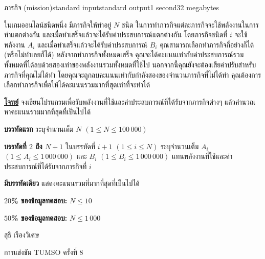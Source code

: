 \documentclass[11pt,a4paper]{article}
\begin{document}
\begin{problem}{ภารกิจ (mission)}{standard input}{standard output}{1 second}{32 megabytes}

ในเกมออนไลน์ชนิดหนึ่ง มีภารกิจให้ทำอยู่ $N$ ชนิด ในการทำภารกิจแต่ละภารกิจจะใช้พลังงานในการทำแตกต่างกัน และเมื่อทำเสร็จแล้วจะได้รับค่าประสบการณ์แตกต่างกัน โดยภารกิจชนิดที่ $i$ จะใช้พลังงาน $A_i$ และเมื่อทำเสร็จแล้วจะได้รับค่าประสบการณ์ $B_i$ คุณสามารถเลือกทำภารกิจกี่อย่างก็ได้ (หรือไม่ทำเลยก็ได้) หลังจากทำภารกิจทั้งหมดเสร็จ คุณจะได้คะแนนเท่ากับค่าประสบการณ์รวมทั้งหมดที่ได้ลบด้วยสองเท่าของพลังงานรวมทั้งหมดที่ใช้ไป นอกจากนี้คุณยังจะต้องเสียค่าปรับสำหรับภารกิจที่คุณไม่ได้ทำ โดยคุณจะถูกลบคะแนนเท่ากับกำลังสองของจำนวนภารกิจที่ไม่ได้ทำ คุณต้องการเลือกทำภารกิจเพื่อให้ได้คะแนนรวมมากที่สุดเท่าที่จะทำได้

\bigskip
\underline{\textbf{โจทย์}}  จงเขียนโปรแกรมเพื่อรับพลังงานที่ใช้และค่าประสบการณ์ที่ได้รับจากภารกิจต่างๆ แล้วคำนวณหาคะแนนรวมมากที่สุดที่เป็นไปได้



\InputFile

\textbf{บรรทัดแรก} ระบุจำนวนเต็ม $N$ $(1 \leq N \leq 100\,000)$

\textbf{บรรทัดที่ $2$ ถึง $N+1$} ในบรรทัดที่ $i+1$ $(1 \leq i \leq N)$ ระบุจำนวนเต็ม $A_i$ $(1 \leq A_i \leq 1\,000\,000)$ และ $B_i$ $(1 \leq B_i \leq 1\,000\,000)$ แทนพลังงานที่ใช้และค่าประสบการณ์ที่ได้รับจากภารกิจที่ $i$


\OutputFile

\textbf{มีบรรทัดเดียว} แสดงคะแนนรวมที่มากที่สุดที่เป็นไปได้

\Examples

\begin{example}
%
\end{example}
\begin{example}
%
\end{example}

\Scoring 

\textbf{$20$\% ของข้อมูลทดสอบ:} $N \leq 10$

\textbf{$50$\% ของข้อมูลทดสอบ: }$N \leq 1\,000$


\Source

สุธี เรืองวิเศษ 

การแข่งขัน TUMSO ครั้งที่ 8


\end{problem}
\end{document}
